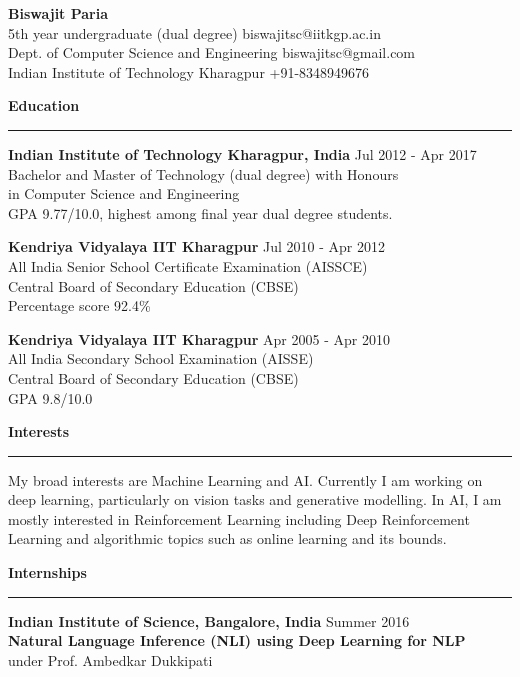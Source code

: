 \documentclass[10pt]{article}
\newcommand{\heading}[1]{
 {\large \textbf{#1}}
  \vspace{0.4em}
  \hrule
  \vspace{0.4em}
}
\newcommand{\EntryGap}{\vspace{0.5cm}}
\newcommand{\SmallEntryGap}{\vspace{0.2cm}}
\begin{document}

{\Large \textbf{Biswajit Paria}}\\
5th year undergraduate (dual degree) \hfill biswajitsc@iitkgp.ac.in\\
Dept. of Computer Science and Engineering \hfill biswajitsc@gmail.com\\
Indian Institute of Technology Kharagpur \hfill  +91-8348949676  
\EntryGap



\heading{Education}
\SmallEntryGap
\textbf{Indian Institute of Technology Kharagpur, India} \hfill Jul 2012 - Apr 2017\\
Bachelor and Master of Technology (dual degree) with Honours\\
in Computer Science and Engineering\\
GPA 9.77/10.0, highest among final year dual degree students.

\SmallEntryGap
\textbf{Kendriya Vidyalaya IIT Kharagpur} \hfill Jul 2010 - Apr 2012\\
All India Senior School Certificate Examination (AISSCE)\\
Central Board of Secondary Education (CBSE)\\
Percentage score 92.4\%

\SmallEntryGap
\textbf{Kendriya Vidyalaya IIT Kharagpur} \hfill Apr 2005 - Apr 2010\\
All India Secondary School Examination (AISSE)\\
Central Board of Secondary Education (CBSE)\\
GPA 9.8/10.0

\EntryGap
\heading{Interests}

\SmallEntryGap

My broad interests are Machine Learning and AI. Currently I am working
on deep learning, particularly on vision tasks and generative modelling.
In AI, I am mostly interested in  Reinforcement Learning including Deep Reinforcement
Learning and algorithmic topics such as online learning and its bounds.

\EntryGap



\heading{Internships}

\textbf{Indian Institute of Science, Bangalore, India} \hfill Summer 2016\\
\textbf{Natural Language Inference (NLI) using Deep Learning for NLP}\\
under Prof. Ambedkar Dukkipati
\end{document}
